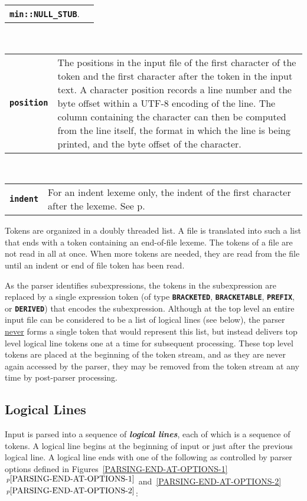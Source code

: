 \documentclass[12pt]{article}
\makeatletter
\newcommand{\TT}[1]{{\tt \bfseries #1}}
\newcommand{\skey}[2]{{\bf \em #1#2}\index{#1}}
\newcommand{\ttmkey}[2]{\TT{#1}\index{#1@{\tt #1}!#2}}
\newcommand{\itemref}[1]{\ref{#1}$\,^{p\pageref{#1}}$}
\newcommand{\pagref}[1]{p\pageref{#1}}
\newcommand{\EOL}{\penalty \exhyphenpenalty}
\newenvironment{indpar}[1][0.3in]%
	{\begin{list}{}%
		     {\setlength{\itemsep}{0in}%
		      \setlength{\topsep}{0in}%
		      \setlength{\parsep}{1ex}%
		      \setlength{\labelwidth}{#1}%
		      \setlength{\leftmargin}{#1}%
		      \addtolength{\leftmargin}{\labelsep}}%
	 \item}%
	{\end{list}}
\makeatother
\begin{document}
\begin{indpar}
\begin{tabular}{p{1in}p{4.5in}}
		  \TT{min::\EOL NULL\_\EOL STUB}.
\end{tabular}
\\[1ex]
\begin{tabular}{p{1in}p{4.5in}}
\ttmkey{position}{of token}
		& The positions in the input file of
                  the first character of the token
		  and the first character after the token in the
		  input text.  A character position records a line number
		  and the byte offset within a UTF-8 encoding
		  of the line.  The column containing the character
		  can then be computed from the line itself, the format
		  in which the line is being printed, and the
		  byte offset of the character.
\end{tabular}
\\[1ex]
\begin{tabular}{p{1in}p{4.5in}}
\ttmkey{indent}{of token}
	        & For an indent lexeme only,
		  the indent of the first character after the lexeme.  See
		  \pagref{INDENT-OF-CHARACTER}.
\end{tabular}
\end{indpar}

Tokens are organized in a doubly threaded list.  A file is translated into
such a list that ends with a token containing an end-of-file
lexeme.
The tokens of a file are not read in all at once.  When more tokens
are needed, they are read from the file until an indent or end of file
token has been read.

As the parser identifies subexpressions, the tokens in the
subexpression are replaced by a single expression token (of
type \TT{BRACKETED}, \TT{BRACKETABLE}, \TT{PREFIX}, or \TT{DERIVED})
that encodes the subexpression.
Although at the top level an entire
input file can be considered to be a list of logical lines (see below),
the parser \underline{never}
forms a single token that would represent this list, but instead
delivers top level logical line tokens
one at a time for subsequent
processing.  These top level tokens are placed at the
beginning of the token stream, and as they are never again accessed
by the parser, they may be removed from the token stream at any time
by post-parser processing.

\subsection{Logical Lines}
\label{LOGICAL-LINES}

Input is parsed into a sequence of \skey{logical line}s, each of which is
a sequence of tokens.
A logical line begins at the beginning of input or just after
the previous logical line.  A logical line ends with one
of the following as controlled by parser options defined in
Figures~\itemref{PARSING-END-AT-OPTIONS-1}
and~\itemref{PARSING-END-AT-OPTIONS-2}:
\end{document}
